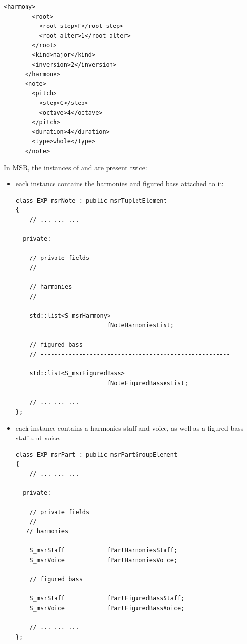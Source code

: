\begin{lstlisting}[language=MusicXML]
      <harmony>
        <root>
          <root-step>F</root-step>
          <root-alter>1</root-alter>
        </root>
        <kind>major</kind>
        <inversion>2</inversion>
      </harmony>
      <note>
        <pitch>
          <step>C</step>
          <octave>4</octave>
        </pitch>
        <duration>4</duration>
        <type>whole</type>
      </note>
\end{lstlisting}

In MSR, the instances of  and  are present twice:
\begin{itemize}
\item each  instance contains the harmonies and figured bass attached to it:
\begin{lstlisting}[language=CPlusPlus]
class EXP msrNote : public msrTupletElement
{
	// ... ... ...

  private:

    // private fields
    // ------------------------------------------------------

    // harmonies
    // ------------------------------------------------------

    std::list<S_msrHarmony>
                          fNoteHarmoniesList;

    // figured bass
    // ------------------------------------------------------

    std::list<S_msrFiguredBass>
                          fNoteFiguredBassesList;

	// ... ... ...
};
\end{lstlisting}

\item each  instance contains a harmonies staff and voice, as well as a figured bass staff and voice:
\begin{lstlisting}[language=CPlusPlus]
class EXP msrPart : public msrPartGroupElement
{
	// ... ... ...

  private:

    // private fields
    // ------------------------------------------------------
   // harmonies

    S_msrStaff            fPartHarmoniesStaff;
    S_msrVoice            fPartHarmoniesVoice;

    // figured bass

    S_msrStaff            fPartFiguredBassStaff;
    S_msrVoice            fPartFiguredBassVoice;

	// ... ... ...
};
\end{lstlisting}
\end{itemize}

